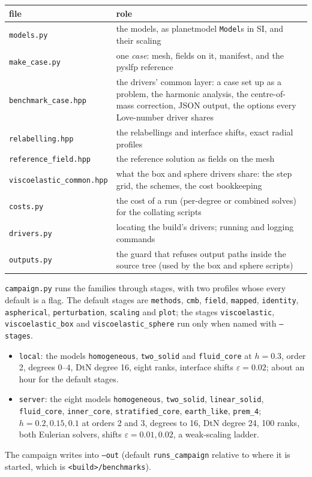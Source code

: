 \documentclass[11pt]{article}
\numberwithin{equation}{section}
\newcommand{\eps}{\varepsilon}
\newcommand{\code}[1]{\texttt{#1}}
\begin{document}
\begin{center}
\small
\begin{tabular}{@{}lP{10.5cm}@{}}
\toprule
file & role \\
\midrule
\code{models.py} & the models, as planetmodel \code{Model}s in SI, and their scaling \\
\code{make\_case.py} & one \emph{case}: mesh, fields on it, manifest, and the pyslfp reference \\
\code{benchmark\_case.hpp} & the drivers' common layer: a case set up as a problem, the harmonic analysis, the centre-of-mass correction, JSON output, the options every Love-number driver shares \\
\code{relabelling.hpp} & the relabellings and interface shifts, exact radial profiles \\
\code{reference\_field.hpp} & the reference solution as fields on the mesh \\
\code{viscoelastic\_common.hpp} & what the box and sphere drivers share: the step grid, the schemes, the cost bookkeeping \\
\code{costs.py} & the cost of a run (per-degree or combined solves) for the collating scripts \\
\code{drivers.py} & locating the build's drivers; running and logging commands \\
\code{outputs.py} & the guard that refuses output paths inside the source tree (used by the box and sphere scripts) \\
\bottomrule
\end{tabular}
\end{center}

\code{campaign.py} runs the families through stages, with two profiles
whose every default is a flag. The default stages are \code{methods},
\code{cmb}, \code{field}, \code{mapped}, \code{identity},
\code{aspherical}, \code{perturbation}, \code{scaling} and \code{plot};
the stages \code{viscoelastic}, \code{viscoelastic\_box} and
\code{viscoelastic\_sphere} run only when named with \code{--stages}.
\begin{itemize}[leftmargin=*]
\item \code{local}: the models \code{homogeneous}, \code{two\_solid} and
  \code{fluid\_core} at $h=0.3$, order 2, degrees $0$--$4$, DtN degree 16,
  eight ranks, interface shifts $\eps=0.02$; about an hour for the default
  stages.
\item \code{server}: the eight models \code{homogeneous},
  \code{two\_solid}, \code{linear\_solid}, \code{fluid\_core},
  \code{inner\_core}, \code{stratified\_core}, \code{earth\_like},
  \code{prem\_4}; $h=0.2,0.15,0.1$ at orders 2 and 3, degrees to 16, DtN
  degree 24, 100 ranks, both Eulerian solvers, shifts $\eps=0.01,0.02$, a
  weak-scaling ladder.
\end{itemize}
The campaign writes into \code{--out} (default \code{runs\_campaign}
relative to where it is started, which is \code{<build>/benchmarks}).
\end{document}
